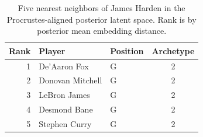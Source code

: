 \begin{table}[htbp]
  \centering\small
  \begin{tabular}{rllc}
    \toprule
    Rank & Player & Position & Archetype \\
    \midrule
    1 & De'Aaron Fox & G & 2 \\
    2 & Donovan Mitchell & G & 2 \\
    3 & LeBron James & G & 2 \\
    4 & Desmond Bane & G & 2 \\
    5 & Stephen Curry & G & 2 \\
    \bottomrule
  \end{tabular}
  \caption{Five nearest neighbors of James Harden in the Procrustes-aligned posterior latent space. Rank is by posterior mean embedding distance.}
  \label{tab:James_Harden_neighbors}
\end{table}


